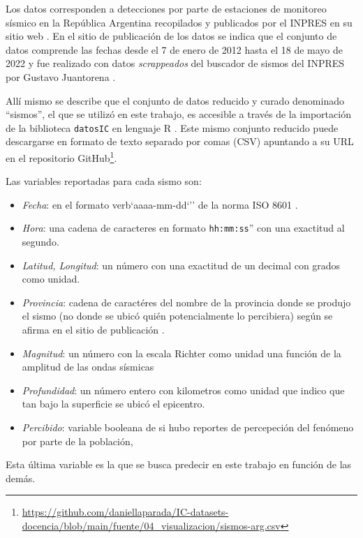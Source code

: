 \documentclass[a4paper]{report}
\begin{document}
Los datos corresponden a detecciones por parte de estaciones de monitoreo sísmico en la República Argentina recopilados y publicados por el INPRES en su sitio web \cite{noauthor_buscador_nodate}.
En el sitio de publicación de los datos se indica que el conjunto de datos comprende las fechas desde el 7 de enero de 2012 hasta el 18 de mayo de 2022 y fue realizado con datos \emph{scrappeados} del buscador de sismos del INPRES por Gustavo Juantorena \cite[sección 4.1]{daniela_parada_ic-datasets-docencia_nodate}. 

Allí mismo se describe que el conjunto de datos reducido y curado denominado ``sismos'', el que se utilizó en este trabajo, es accesible a través de la importación de la biblioteca \texttt{datosIC} en lenguaje R  \cite[sección 5.1.1]{daniela_parada_ic-datasets-docencia_nodate}.
Este mismo conjunto reducido puede descargarse en formato de texto separado por comas (CSV) apuntando a su URL en el repositorio GitHub\footnote{\url{https://github.com/daniellaparada/IC-datasets-docencia/blob/main/fuente/04_visualizacion/sismos-arg.csv}}.

Las variables reportadas para cada sismo son:
\begin{itemize}
	\item \emph{Fecha}: en el formato verb`aaaa-mm-dd`'' de la norma ISO 8601 \cite{noauthor_iso_2019}.
	\item \emph{Hora}: una cadena de caracteres en formato \verb`hh:mm:ss`'' con una exactitud al segundo.
	\item \emph{Latitud, Longitud}: un número con una exactitud de un decimal con grados como unidad.
	\item \emph{Provincia}: cadena de caractéres del nombre de la provincia donde se produjo el sismo (no donde se ubicó quién potencialmente lo percibiera) según se afirma en el sitio de publicación \cite[5.1.1]{daniela_parada_ic-datasets-docencia_nodate}.
	\item \emph{Magnitud}: un número con la escala Richter como unidad una función de la amplitud de las ondas sísmicas \cite[sección 4.2.3]{fowler_solid_1990}
	\item \emph{Profundidad}: un número entero con kilometros como unidad que indico que tan bajo la superficie se ubicó el epicentro.
	\item \emph{Percibido}: variable booleana de si hubo reportes de percepeción del fenómeno por parte de la población, 
\end{itemize}
Esta última variable es la que se busca predecir en este trabajo en función de las demás. 
\end{document}
